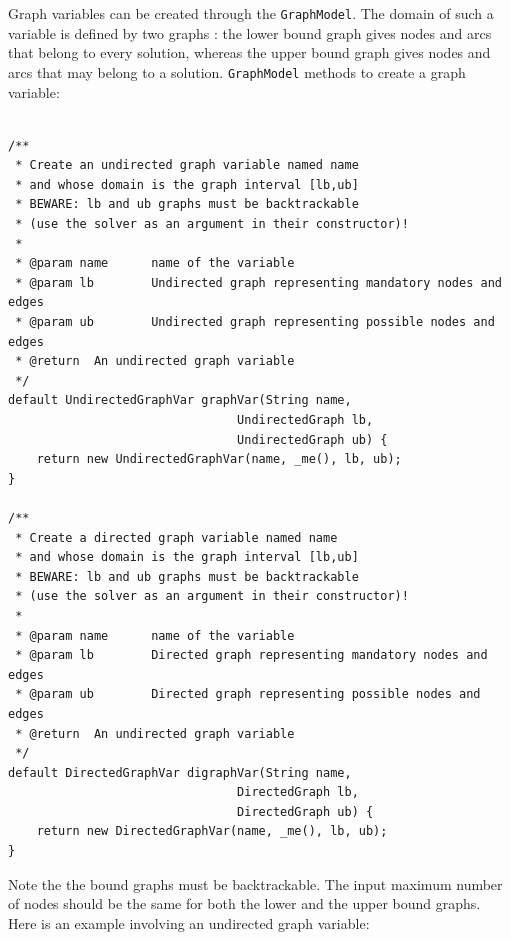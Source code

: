 \documentclass{article}
\begin{document}
Graph variables can be created through the \texttt{GraphModel}. The domain of such a variable is defined by two graphs : the lower bound graph gives nodes and arcs that belong to every solution, whereas the upper bound graph gives nodes and arcs that may belong to a solution. \texttt{GraphModel} methods to create a graph variable:

\begin{lstlisting}

/**
 * Create an undirected graph variable named name
 * and whose domain is the graph interval [lb,ub]
 * BEWARE: lb and ub graphs must be backtrackable
 * (use the solver as an argument in their constructor)!
 *
 * @param name		name of the variable
 * @param lb		Undirected graph representing mandatory nodes and edges
 * @param ub		Undirected graph representing possible nodes and edges
 * @return	An undirected graph variable
 */
default UndirectedGraphVar graphVar(String name, 
								UndirectedGraph lb, 
								UndirectedGraph ub) {
	return new UndirectedGraphVar(name, _me(), lb, ub);
}

/**
 * Create a directed graph variable named name
 * and whose domain is the graph interval [lb,ub]
 * BEWARE: lb and ub graphs must be backtrackable
 * (use the solver as an argument in their constructor)!
 *
 * @param name		name of the variable
 * @param lb		Directed graph representing mandatory nodes and edges
 * @param ub		Directed graph representing possible nodes and edges
 * @return	An undirected graph variable
 */
default DirectedGraphVar digraphVar(String name, 
								DirectedGraph lb, 
								DirectedGraph ub) {
	return new DirectedGraphVar(name, _me(), lb, ub);
}
\end{lstlisting}

Note the the bound graphs must be backtrackable. The input maximum number of nodes should be the same for both the lower and the upper bound graphs. 
%
%
Here is an example involving an undirected graph variable:
\end{document}
